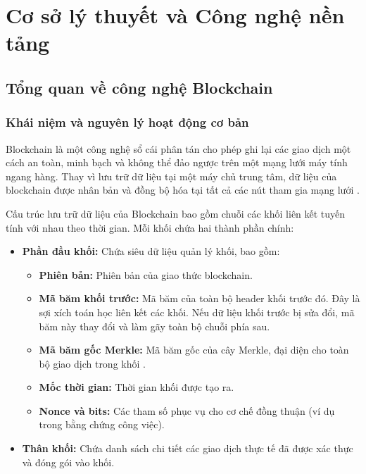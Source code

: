 \documentclass[12pt,a4paper]{article}
\begin{document}
\newpage

\section{Cơ sở lý thuyết và Công nghệ nền tảng}

\subsection{Tổng quan về công nghệ Blockchain}

\subsubsection{Khái niệm và nguyên lý hoạt động cơ bản}
Blockchain là một công nghệ sổ cái phân tán cho phép ghi lại các giao dịch một cách an toàn, minh bạch và không thể đảo ngược trên một mạng lưới máy tính ngang hàng. Thay vì lưu trữ dữ liệu tại một máy chủ trung tâm, dữ liệu của blockchain được nhân bản và đồng bộ hóa tại tất cả các nút tham gia mạng lưới \cite{antonopoulos}.

Cấu trúc lưu trữ dữ liệu của Blockchain bao gồm chuỗi các khối liên kết tuyến tính với nhau theo thời gian. Mỗi khối chứa hai thành phần chính:
\begin{itemize}
    \item \textbf{Phần đầu khối:} Chứa siêu dữ liệu quản lý khối, bao gồm:
    \begin{itemize}
        \item \textbf{Phiên bản:} Phiên bản của giao thức blockchain.
        \item \textbf{Mã băm khối trước:} Mã băm của toàn bộ header khối trước đó. Đây là sợi xích toán học liên kết các khối. Nếu dữ liệu khối trước bị sửa đổi, mã băm này thay đổi và làm gãy toàn bộ chuỗi phía sau.
        \item \textbf{Mã băm gốc Merkle:} Mã băm gốc của cây Merkle, đại diện cho toàn bộ giao dịch trong khối \cite{antonopoulos}.
        \item \textbf{Mốc thời gian:} Thời gian khối được tạo ra.
        \item \textbf{Nonce và bits:} Các tham số phục vụ cho cơ chế đồng thuận (ví dụ trong bằng chứng công việc).
    \end{itemize}
    \item \textbf{Thân khối:} Chứa danh sách chi tiết các giao dịch thực tế đã được xác thực và đóng gói vào khối.
\end{itemize}
\end{document}
